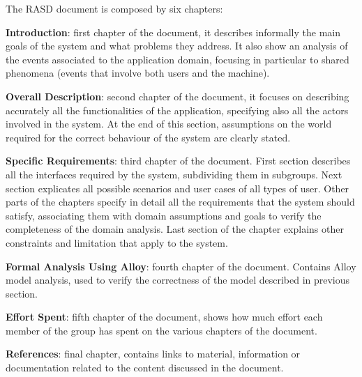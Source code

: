 The RASD document is composed by six chapters:

\textbf{Introduction}: first chapter of the document, it describes informally the main goals of the system and what problems they address. It also show an analysis of the events associated to the application domain, focusing in particular to shared phenomena (events that involve both users and the machine).

\textbf{Overall Description}: second chapter of the document, it focuses on describing accurately all the functionalities of the application, specifying also all the actors involved in the system. At the end of this section, assumptions on the world required for the correct behaviour of the system are clearly stated. 

\textbf{Specific Requirements}: third chapter of the document. First section describes all the interfaces required by the system, subdividing them in subgroups. Next section explicates all possible scenarios and user cases of all types of user. Other parts of the chapters specify in detail all the requirements that the system should satisfy, associating them with domain assumptions and goals to verify the completeness of the domain analysis. Last section of the chapter explains other constraints and limitation that apply to the system.

\textbf{Formal Analysis Using Alloy}: fourth chapter of the document. Contains Alloy model analysis, used to verify the correctness of the model described in previous section. 

\textbf{Effort Spent}: fifth chapter of the document, shows how much effort each member of the group has spent on the various chapters of the document.

\textbf{References}: final chapter, contains links to material, information or documentation related to the content discussed in the document.